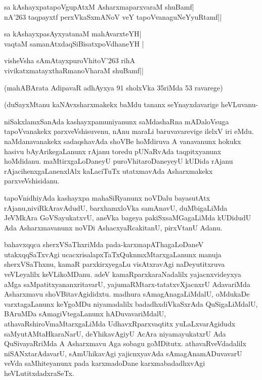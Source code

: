 \begin{shloka}
sa kAshayxpatapoVgupAtxM AsharxmaparxvaraM shuBamf|\\
nA\char'263 taqpayxtf perxVkaSxmANoV veY tapoVvanaguNeYyuRtamf||
\end{shloka}

\begin{shloka}
sa kAshayxpasAyxyatanaM mahAvarxteYH|\\
vaqtaM samanAtxdaqSiBisatxpoVdhaneYH |
\end{shloka}

\begin{shloka}
visheVsha sAmAtayxpuroVhitoV\char'263 rihA\\
vivikatxmatayxthaRmanoVharaM shuBamf||
\end{shloka}

\noindent
(mahABArata AdipavaR adhAyxya 91 sholxVka 35riMda 53 ravarege)

\noindent
(duSayxMtanu kaNAvxsharxmakekx baMdu tananx seYnayxdavarige heVLuvanu-

\smallskip
niSakxlamxSanAda kashayxpamuniyanunx saMdashaRna mADaloVsuga tapoVvanakekx parxveVshisuvenu, nAnu maraLi baruvavarevige ilelxV iri eMdu. naMdanavanakekx sadaqshavAda shoVBe hoMdiruva A vana\-vanunx hokukx hasivu bAyArikegaLanunx rAjanu toredu pUNaRvAda taqpitxyanunx hoMdidanu. maMtirx\-gaLoDa\-neyU puroVhitaroDaneyeyU kUDida rAjanu rAjacihenxgaLanenxlAlx kaLaciTuTx utatxma\-vAda Asharxmakekx parxveVshisidanu.

tapoVnidhiyAda kashayxpa mahaSiRyanunx noVDalu bayasutAtx rAjanu,\break niviRkAravAdudU, barxhamx\-loVka samAnavU, duMbigaLiMda JeVMkAra GoVSa\-yukatxvU, aneVka bageya pakiSxsaMGagaLiMda kUDi\-dudU Ada Asharxmavanunx noVDi AshacxyaRcakitanU, pirxVtanU Adanu.

bahavxqqca sherxVSaThxriMda pada-karxmapAThagaLoDaneV utakxqqSaTxvAgi ucacxrisalapxTaTx\break QuknmxMtarx\-gaLanunx manuja sherxVSaThxnu, kamaR parxkirxyegaLu visAtxravAgi naDeyutitxruva veVLeyalilx keVLikoMDanu. adeV kamaRparxkaraNa\-dalilx yajacnx\-videyxya aMga saMpatitx\-yananxritavarU, yajumaRMtarx-tatatxvXjacnxrU AdavariMda Asharxmavu shoV\-Bita\-vAgi\-didxtu. madhura sAmagAnagaLiMdalU, oMdukaDe varxtagaLanunx keYgoMDu niyama\-dalilx badadhxdiVkaSx\-rAda QuSigaLiMdalU, BAruMDa sAmagiVtegaLanunx hADuvava\break\-riMdalU, athavaRshiroVmaMtarxgaLiMda UdhavxRparxvaqtitx yuLaLxvarAgidudx saMyu\-tAMtaHkaraNarU, deYhikavAgiyU AcAra niyamayukatxrU Ada QuSivayaR\-riMda A Asharxmavu Aga sobagu goMDitutx. athavaRveVdadalilx niSANxtarAdavarU, sAmUhika\-vAgi yajicnxyavAda sAmagAnamADuvavarU veVda saMhiteyanunx pada karxmadoDane karxma\-badadhxvAgi heVLutitxdadxraSeTx.

